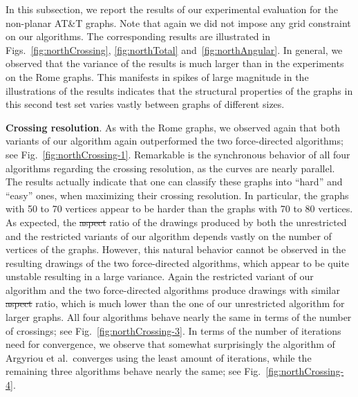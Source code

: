 \documentclass{comjnl}
\newcommand{\myparagraph}[1]{\medskip\noindent\textbf{#1}.}
\providecommand{\DIFaddtex}[1]{{\protect\color{blue}\uwave{#1}}} %
\providecommand{\DIFdeltex}[1]{{\protect\color{red}\sout{#1}}}                      %
\providecommand{\DIFaddbegin}{} %
\providecommand{\DIFaddend}{} %
\providecommand{\DIFdelbegin}{} %
\providecommand{\DIFdelend}{} %
\providecommand{\DIFadd}[1]{\texorpdfstring{\DIFaddtex{#1}}{#1}} %
\providecommand{\DIFdel}[1]{\texorpdfstring{\DIFdeltex{#1}}{}} %
\newcommand{\DIFscaledelfig}{0.5}
\newlength{\DIFdelgraphicswidth} %
\newlength{\DIFdelgraphicsheight} %
\newcommand{\DIFaddincludegraphics}[2][]{{\color{blue}\fbox{\DIFOincludegraphics[#1]{#2}}}} %
\newcommand{\DIFdelincludegraphics}[2][]{%
\sbox{\DIFdelgraphicsbox}{\DIFOincludegraphics[#1]{#2}}%
\settoboxwidth{\DIFdelgraphicswidth}{\DIFdelgraphicsbox} %
\settoboxtotalheight{\DIFdelgraphicsheight}{\DIFdelgraphicsbox} %
\scalebox{\DIFscaledelfig}{%
\parbox[b]{\DIFdelgraphicswidth}{\usebox{\DIFdelgraphicsbox}\\[-\baselineskip] \rule{\DIFdelgraphicswidth}{0em}}\llap{\resizebox{\DIFdelgraphicswidth}{\DIFdelgraphicsheight}{%
\setlength{\unitlength}{\DIFdelgraphicswidth}%
\begin{picture}(1,1)%
\thicklines\linethickness{2pt} %
{\color[rgb]{1,0,0}\put(0,0){\framebox(1,1){}}}%
{\color[rgb]{1,0,0}\put(0,0){\line( 1,1){1}}}%
{\color[rgb]{1,0,0}\put(0,1){\line(1,-1){1}}}%
\end{picture}%
}\hspace*{3pt}}} %
} %
\DeclareRobustCommand{\DIFaddbegin}{\DIFOaddbegin \let\includegraphics\DIFaddincludegraphics} %
\DeclareRobustCommand{\DIFaddend}{\DIFOaddend \let\includegraphics\DIFOincludegraphics} %
\DeclareRobustCommand{\DIFdelbegin}{\DIFOdelbegin \let\includegraphics\DIFdelincludegraphics} %
\DeclareRobustCommand{\DIFdelend}{\DIFOaddend \let\includegraphics\DIFOincludegraphics} %
\begin{document}
In this subsection, we report the results of our experimental evaluation for the non-planar AT\&T graphs. Note that again we did not impose any grid constraint on our algorithms. The corresponding results are illustrated in Figs.~\ref{fig:northCrossing}, \ref{fig:northTotal} and~\ref{fig:northAngular}. In general, we observed that the variance of the results is much larger than in the experiments on the Rome graphs. This manifests in spikes of large magnitude in the illustrations of the results indicates that the structural properties of the graphs in this second test set varies vastly between graphs of different sizes.

\myparagraph{Crossing resolution} As with the Rome graphs, we observed again that both variants of our algorithm again outperformed the two force-directed algorithms; see Fig.~\ref{fig:northCrossing-1}. Remarkable is the synchronous behavior of all four algorithms regarding the crossing resolution, as the curves are nearly parallel. The results actually indicate that one can classify these graphs into ``hard'' and ``easy'' ones, when maximizing their crossing resolution. In particular, the graphs with 50 to 70 vertices appear to be harder than the graphs with 70 to 80 vertices. As expected, the \DIFdelbegin \DIFdel{aspect }\DIFdelend \DIFaddbegin \DIFadd{edge-length }\DIFaddend ratio of the drawings produced by both the unrestricted and the restricted variants of our algorithm depends vastly on the number of vertices of the graphs. However, this natural behavior cannot be observed in the resulting drawings of the two force-directed algorithms, which appear to be quite unstable resulting in a large variance. Again the restricted variant of our algorithm and the two force-directed algorithms produce drawings with similar \DIFdelbegin \DIFdel{aspect }\DIFdelend \DIFaddbegin \DIFadd{edge-length }\DIFaddend ratio, which is much lower than the one of our unrestricted algorithm for larger graphs. All four algorithms behave nearly the same in terms of the number of crossings; see Fig.~\ref{fig:northCrossing-3}. In terms of the number of iterations need for convergence, we observe that somewhat surprisingly the algorithm of Argyriou et al.\ converges using the least amount of iterations, while the remaining three algorithms behave nearly the same; see Fig.~\ref{fig:northCrossing-4}.
\end{document}
